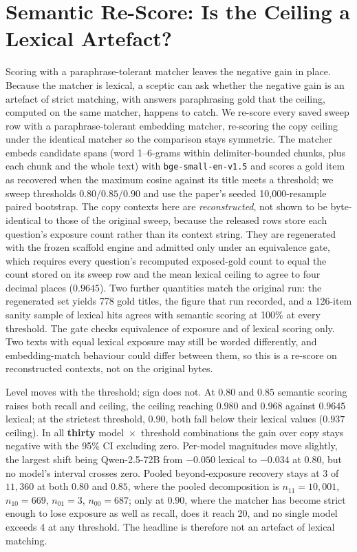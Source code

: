 \documentclass[10pt,twocolumn]{article}
\begin{document}
\section{Semantic Re-Score: Is the Ceiling a Lexical Artefact?}\label{sec:rescore}
Scoring with a paraphrase-tolerant matcher leaves the negative gain in place. Because the matcher is lexical, a sceptic
can ask whether the negative gain is an artefact of strict matching, with answers paraphrasing gold
that the ceiling, computed on the same matcher, happens to catch. We re-score every saved sweep row with a paraphrase-tolerant embedding matcher, re-scoring the
copy ceiling under the identical matcher so the comparison stays symmetric. The matcher embeds
candidate spans (word 1--6-grams within delimiter-bounded chunks, plus each chunk and the whole text)
with \texttt{bge-small-en-v1.5} and scores a gold item as recovered when the maximum cosine against
its title meets a threshold; we sweep thresholds $0.80/0.85/0.90$ and use the paper's seeded
10{,}000-resample paired bootstrap. The copy contexts here are \emph{reconstructed}, not shown to be byte-identical to
those of the original sweep, because the released rows store each question's exposure count rather
than its context string. They are regenerated with the frozen scaffold engine and admitted only under an
equivalence gate, which requires every question's recomputed exposed-gold count to equal the count
stored on its sweep row and the mean lexical ceiling to agree to four decimal places ($0.9645$).
Two further quantities match the original run: the regenerated set yields 778 gold titles, the
figure that run recorded, and a 126-item sanity sample of lexical hits agrees with semantic scoring
at 100\% at every threshold. The gate checks equivalence of exposure and of lexical scoring only. Two texts with equal lexical
exposure may still be worded differently, and embedding-match behaviour could differ between them,
so this is a re-score on reconstructed contexts, not on the original bytes.

Level moves with the threshold; sign does not. At $0.80$ and $0.85$ semantic scoring
raises both recall and ceiling, the ceiling reaching $0.980$ and $0.968$ against $0.9645$ lexical; at
the strictest threshold, $0.90$, both fall below their lexical values ($0.937$ ceiling). In all
\textbf{thirty} model~$\times$~threshold combinations the gain over copy stays negative with the
95\% CI excluding zero. Per-model magnitudes move slightly, the largest shift being Qwen-2.5-72B from
$-0.050$ lexical to $-0.034$ at $0.80$, but no model's interval crosses zero. Pooled beyond-exposure
recovery stays at 3 of $11{,}360$ at both $0.80$ and $0.85$, where the pooled decomposition is
$n_{11}=10{,}001$, $n_{10}=669$, $n_{01}=3$, $n_{00}=687$; only at $0.90$, where the matcher has
become strict enough to lose exposure as well as recall, does it reach 20, and no single model
exceeds 4 at any threshold. The headline is therefore not an artefact of lexical matching.
\end{document}
